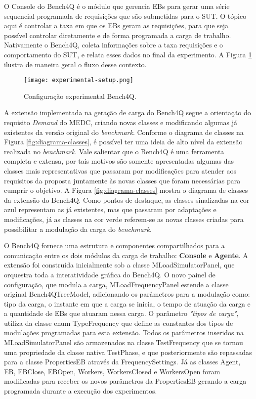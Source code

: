 O Console do Bench4Q é o módulo que gerencia EBs para gerar uma série sequencial programada de requisições que são submetidas para o SUT. O tópico aqui é controlar a taxa em que os EBs geram as requisições, para que seja possível controlar diretamente e de forma programada a carga de trabalho. Nativamente o Bench4Q, coleta informações sobre a taxa requisições e o comportamento do SUT, e relata esses dados no final da experimento. A Figura \ref{fig:experimental-setup} ilustra de maneira geral o fluxo desse contexto.

\begin{figure}[!htb]
	\centering
	\texttt{[image: experimental-setup.png]}	
	\caption{Configuração experimental Bench4Q.}
	\label{fig:experimental-setup}
\end{figure}

A extensão implementada na geração de carga do Bench4Q segue a orientação do requisito \textit{Demand} do MEDC, criando novas classes e modificando algumas já existentes da versão original do \textit{benchmark}. Conforme o diagrama de classes na Figura \ref{fig:diagrama-classes}, é possível ter uma ideia de alto nível da extensão realizada no \textit{benchmark}. Vale salientar que o Bench4Q é uma ferramenta completa e extensa, por tais motivos são somente apresentadas algumas das classes mais representativas que passaram por modificações para atender aos requisitos da proposta  juntamente às novas classes que foram necessárias para cumprir o objetivo. A Figura \ref{fig:diagrama-classes} mostra o diagrama de classes da extensão do Bench4Q. Como pontos de destaque, as classes sinalizadas na cor azul representam as já existentes, mas que passaram por adaptações e modificações, já as classes na cor verde referem-se as novas classes criadas para possibilitar a modulação da carga do \textit{benchmark}.

O Bench4Q fornece uma estrutura e componentes compartilhados para a comunicação entre os dois módulos da carga de trabalho: \textbf{Console} e \textbf{Agente}. A extensão foi construída inicialmente sob a classe \textsf{MLoadSimulatorPanel}, que orquestra toda a interatividade gráfica do Bench4Q. O novo painel de configuração, que modula a carga, \textsf{MLoadFrequencyPanel} estende a classe original \textsf{Bench4QTreeModel}, adicionando os parâmetros para a modulação como: tipo da carga, o instante em que a carga se inicia, o tempo de atuação da carga e a quantidade de EBs que atuaram nessa carga. O parâmetro \textit{"tipos de carga"}, utiliza da classe enum \textsf{TypeFrequency} que define as constantes dos tipos de modulações programadas para esta extensão.  Todos os parâmetros inseridos na \textsf{MLoadSimulatorPanel} são armazenados na classe \textsf{TestFrequency} que se tornou uma propriedade da classe nativa \textsf{TestPhase}, e que posteriormente são repassadas para a classe \textsf{PropertiesEB} através da \textsf{FrequencySettings}. Já as classes \textsf{Agent}, \textsf{EB}, \textsf{EBClose}, \textsf{EBOpen}, \textsf{Workers}, \textsf{WorkersClosed} e \textsf{WorkersOpen} foram modificadas para receber os novos parâmetros da \textsf{PropertiesEB} gerando a carga programada durante a execução dos experimentos.

